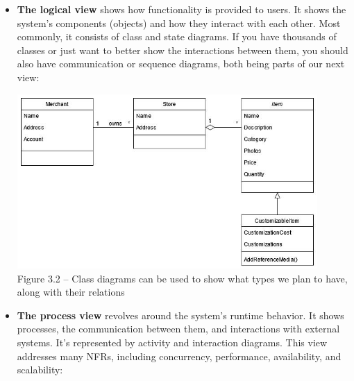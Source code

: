 \begin{itemize}
\item 
\textbf{The logical view} shows how functionality is provided to users. It shows the system's components (objects) and how they interact with each other. Most commonly, it consists of class and state diagrams. If you have thousands of classes or just want to better show the interactions between them, you should also have communication or sequence diagrams, both being parts of our next view:


\begin{center}
\includegraphics[width=0.9\textwidth]{content/1/chapter3/images/2.jpg}\\
Figure 3.2 – Class diagrams can be used to show what types we plan to have, along with their relations
\end{center}

\item 
\textbf{The process view} revolves around the system's runtime behavior. It shows processes, the communication between them, and interactions with external systems. It's represented by activity and interaction diagrams. This view addresses many NFRs, including concurrency, performance, availability, and scalability:



\end{itemize}
